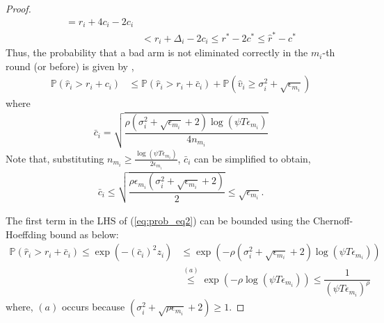 \begin{proof}
\begin{align*}
= r_{i} + 4c_{i} - 2c_{i} \\
 &< r_{i} + \Delta_{i} - 2c_{i}
 \leq r^{*} -2c^{*} 
 \leq \hat{r}^{*} - c^{*}
  \end{align*}
	\noindent
	Thus, the probability that a bad arm is not eliminated correctly in the $m_i$-th round (or before) is given by ,
\begin{align}
\mathbb{P}(\hat{r}_{i}> r_{i} + c_{i})
&\leq \mathbb{P}\left( \hat{r}_{i} > r_{i}+ \bar{c}_i\right) 
+ \mathbb{P}\left( \hat{v}_{i}\geq \sigma_{i}^{2}+\sqrt{\epsilon_{m_{i}}}\right)\label{eq:prob_eq2}
\end{align}
where 
\begin{align*}
\bar{c}_i=\sqrt{\dfrac{\rho (\sigma_{i}^{2}+\sqrt{\epsilon_{m_{i}}} + 2)\log(\psi T\epsilon_{m_{i}})}{4n_{m_i}}}
\end{align*}
Note that, substituting $ n_{m_i} \geq \frac{\log{(\psi T\epsilon_{m_{i}})}}{2\epsilon_{m_{i}}}$, $\bar{c}_i$ can be simplified to obtain,
\begin{align}
\bar{c}_i
\leq \sqrt{\dfrac{\rho\epsilon_{m_{i}}(\sigma_{i}^{2}+\sqrt{\epsilon_{m_{i}}} + 2)}{2}}\leq \sqrt{ \epsilon_{m_{i}}}.
\label{si_bar_equn}
\end{align}

The first term in the LHS of (\ref{eq:prob_eq2}) can be bounded using the Chernoff-Hoeffding bound as below:
\begin{align}
\mathbb{P}\left( \hat{r}_{i} > r_{i}+ \bar{c}_i\right)\nonumber 
\le \exp\left(- (\bar{c}_i)^2 z_i \right)\nonumber 
 &\le \exp\left(- \rho (\sigma_{i}^{2}+\sqrt{\epsilon_{m_{i}}} + 2)\log(\psi  T\epsilon_{m_{i}})\right)\nonumber \\
& \overset{(a)}{\leq} \exp\left(- \rho \log(\psi  T\epsilon_{m_{i}})\right) 
\le \dfrac{1}{(\psi  T\epsilon_{m_{i}})^{\rho}}
\label{lhs1_equn}
\end{align}
where, $(a)$ occurs because $(\sigma_{i}^{2}+\sqrt{\rho\epsilon_{m_{i}}} + 2) \geq 1$.


\end{proof}
